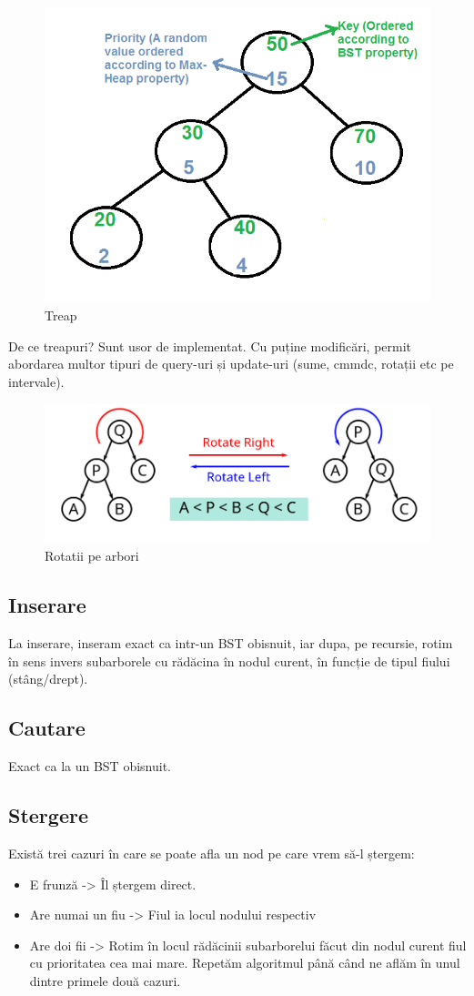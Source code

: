 \documentclass[11pt,a4paper]{article}
\theoremstyle{definition}
\theoremstyle{plain}
\theoremstyle{remark}
\begin{document}
\begin{figure}[H]
    \centering
    \includegraphics[width=0.5\linewidth]{treap1.png}
    \caption{Treap}
    \label{fig:enter-label}
\end{figure}

De ce treapuri? Sunt usor de implementat. Cu puține modificări, permit abordarea multor tipuri de query-uri și update-uri (sume, cmmdc, rotații etc pe intervale).

\begin{figure}[H]
    \centering
    \includegraphics[width=0.5\linewidth]{rotatii1.png}
    \caption{Rotatii pe arbori}
    \label{fig:enter-label}
\end{figure}

\subsection*{Inserare}
La inserare, inseram exact ca intr-un BST obisnuit, iar dupa, pe recursie, rotim în sens invers subarborele cu rădăcina în nodul curent, în funcție de tipul fiului (stâng/drept).

\subsection*{Cautare}
Exact ca la un BST obisnuit.

\subsection*{Stergere}
Există trei cazuri în care se poate afla un nod pe care vrem să-l ștergem:

\begin{itemize}
    \item E frunză -> Îl ștergem direct.
    \item Are numai un fiu -> Fiul ia locul nodului respectiv
    \item Are doi fii -> Rotim în locul rădăcinii subarborelui făcut din nodul curent fiul cu prioritatea cea mai mare. Repetăm algoritmul până când ne aflăm în unul dintre primele două cazuri. 
\end{itemize}
\end{document}
